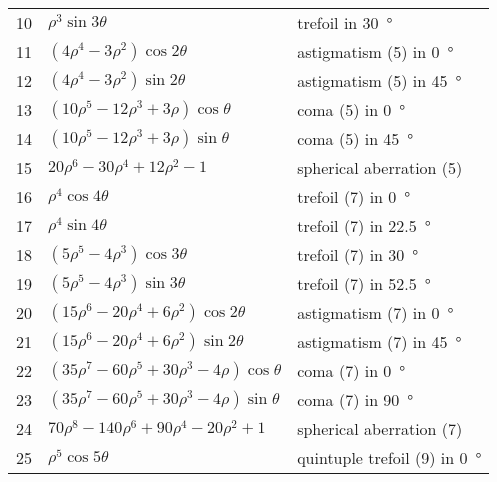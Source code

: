 \begin{center}
\begin{longtable}{cll}
10    &   \( \rho^3 \sin 3 \theta \)                                                  &  trefoil in \SI{30}{\degree} \\
11    &   \( (4\rho^4 - 3 \rho^2)\cos 2 \theta \)                                     &  astigmatism (5) in \SI{0}{\degree} \\
12    &   \( (4\rho^4 - 3 \rho^2)\sin 2 \theta \)                                     &  astigmatism (5) in \SI{45}{\degree} \\
13    &   \( (10 \rho^5 - 12 \rho^3 + 3 \rho)\cos\theta \)                            &  coma (5) in \SI{0}{\degree} \\
14    &   \( (10 \rho^5 - 12 \rho^3 + 3 \rho)\sin\theta \)                            &  coma (5) in \SI{45}{\degree} \\
15    &   \( 20 \rho^6 - 30 \rho^4 + 12\rho^2 - 1 \)                                  &  spherical aberration (5) \\
16    &   \( \rho^4 \cos 4 \theta \)                                                  &  trefoil (7) in \SI{0}{\degree} \\
17    &   \( \rho^4 \sin 4 \theta \)                                                  &  trefoil (7) in \SI{22.5}{\degree} \\
18    &   \( (5 \rho^5 - 4 \rho^3)\cos 3 \theta \)                                    &  trefoil (7) in \SI{30}{\degree} \\
19    &   \( (5 \rho^5 - 4 \rho^3)\sin 3 \theta \)                                    &  trefoil (7) in \SI{52.5}{\degree} \\
20    &   \( (15\rho^6 - 20 \rho^4 + 6 \rho^2)\cos 2 \theta \)                        &  astigmatism (7) in \SI{0}{\degree} \\
21    &   \( (15\rho^6 - 20 \rho^4 + 6 \rho^2)\sin 2 \theta \)                        &  astigmatism (7) in \SI{45}{\degree} \\
22    &   \( (35 \rho^7 - 60 \rho^5 + 30 \rho^3 - 4 \rho)\cos\theta \)                &  coma (7) in \SI{0}{\degree} \\
23    &   \( (35 \rho^7 - 60 \rho^5 + 30 \rho^3 - 4 \rho)\sin\theta \)                &  coma (7) in \SI{90}{\degree} \\
24    &   \( 70 \rho^8 - 140 \rho^6 + 90 \rho^4 - 20 \rho^2 + 1 \)                    &  spherical aberration (7) \\
25    &   \( \rho^5 \cos 5 \theta \)                                                  &  quintuple trefoil (9) in \SI{0}{\degree} \\

\end{longtable}
\end{center}
